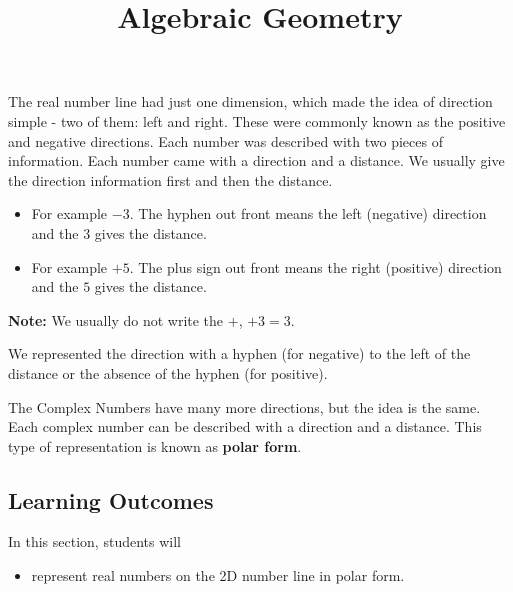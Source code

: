 \documentclass{ximera}
\title{Algebraic Geometry}
\begin{document}
\begin{abstract}
\end{abstract}
\maketitle





The real number line had just one dimension, which made the idea of direction simple - two of them: left and right.  These were commonly known as the positive and negative directions.  Each number was described with two pieces of information.  Each number came with a direction and a distance.  We usually give the direction information first and then the distance.


\begin{itemize}
\item For example $-3$.  The hyphen out front means the left (negative) direction and the $3$ gives the distance.
\item For example $+5$.  The plus sign out front means the right (positive) direction and the $5$ gives the distance.
\end{itemize}
\textbf{Note:} We usually do not write the $+$, $+3 = 3$.

We represented the direction with a hyphen (for negative) to the left of the distance or the absence of the hyphen (for positive).

The Complex Numbers have many more directions, but the idea is the same.  Each complex number can be described with a direction and a distance.  This type of representation is known as \textbf{polar form}.






\subsection{Learning Outcomes}



\begin{sectionOutcomes}
In this section, students will 

\begin{itemize}
\item represent real numbers on the 2D number line in polar form.
\end{itemize}
\end{sectionOutcomes}
\end{document}
